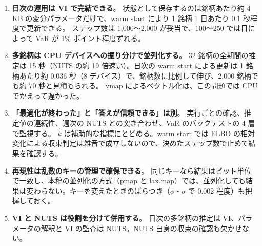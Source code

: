 \begin{enumerate}
  \item \textbf{日次の運用は VI で完結できる}。
    状態として保存するのは銘柄あたり約 4 KB の変分パラメータだけで、warm start により 1 銘柄 1 日あたり 0.1 秒程度で更新できる。
    ステップ数は 1,000〜2,000 が妥当で、100〜250 では日によって VaR が 1\% ポイント程度ずれる。
  \item \textbf{多銘柄は CPU デバイスへの振り分けで並列化する}。
    32 銘柄の全期間の推定は 15 秒（NUTS の約 19 倍速い）。日次の warm start による更新は 1 銘柄あたり約 0.036 秒（8 デバイス）で、銘柄数に比例して伸び、2,000 銘柄でも約 70 秒と見積もられる。
    vmap によるベクトル化は、この問題では CPU でかえって遅かった。
  \item \textbf{「最適化が終わった」と「答えが信頼できる」は別}。
    実行ごとの確認、推定値の連続性、週次の NUTS との突き合わせ、VaR のバックテストの 4 層で監視する。
    $\hat k$ は補助的な指標にとどめる。warm start では ELBO の相対変化による収束判定は雑音で成立しないので、決めたステップ数で止めて結果を確認する。
  \item \textbf{再現性は乱数のキーの管理で確保できる}。
    同じキーなら結果はビット単位で一致し、本稿の並列化の方式（pmap と lax.map）では、並列化しても結果は変わらない。キーを変えたときのばらつき（$\phi$・$\sigma$ で 0.002 程度）も把握しておく。
  \item \textbf{VI と NUTS は役割を分けて併用する}。
    日次の多銘柄の推定は VI、パラメータの解釈と VI の監査は NUTS。NUTS 自身の収束の確認も欠かせない。
\end{enumerate}
